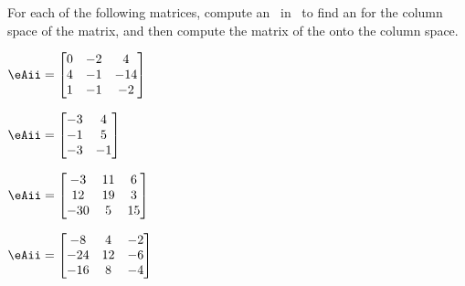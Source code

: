 \begin{exercise} \label{ex:orprmat} 
For each of the following matrices, compute an \svd\ in \script\ to find an  for the column space of the matrix, and then compute the matrix of the  onto the column space.
\begin{parts}
\item \(\eAii=\begin{bmatrix} 0&-2&4
\\4&-1&-14
\\1&-1&-2 \end{bmatrix}\)

\item \(\eAii=\begin{bmatrix} -3&4
\\-1&5
\\-3&-1 \end{bmatrix}\)

\item \(\eAii=\begin{bmatrix} -3&11&6
\\12&19&3
\\-30&5&15 \end{bmatrix}\)

\item \(\eAii=\begin{bmatrix} -8&4&-2
\\-24&12&-6
\\-16&8&-4 \end{bmatrix}\)


\end{parts}
\end{exercise}

